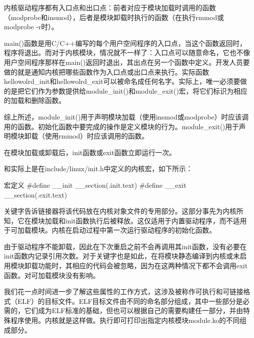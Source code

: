 \documentclass[lang=cn,newtx,10pt,scheme=chinese]{elegantbook}
\begin{document}
内核驱动程序都有入口点和出口点：前者对应于模块加载时调用的函数（modprobe和insmod），后者是模块卸载时执行的函数（在执行rmmod或modprobe -r时）。

main()函数是用C/C++编写的每个用户空间程序的入口点，当这个函数返回时，程序将退出。而对于内核模块，情况就不一样了：入口点可以随意命名，它也不像用户空间程序那样在main()返回时退出，其出点在另一个函数中定义。开发人员要做的就是通知内核把哪些函数作为入口点或出口点来执行。实际函数hellowolrd\_init和hellowolrd\_exit可以被命名成任何名字。实际上，唯一必须要做的是把它们作为参数提供给module\_init()和module\_exit()宏，将它们标识为相应的加载和删除函数。

综上所述，module\_init()用于声明模块加载（使用insmod或modprobe）时应该调用的函数。初始化函数中要完成的操作是定义模块的行为。module\_exit()用于声明模块卸载（使用rmmod）时应该调用的函数。

\begin{marker}
在模块加载或卸载后，init函数或exit函数立即运行一次。
\end{marker}


和实际上是在include/linux/init.h中定义的内核宏，如下所示：

\begin{mycode}{宏定义}
#define __init __section(.init.text)
#define __exit __section(.exit.text)
\end{mycode}

关键字告诉链接器将该代码放在内核对象文件的专用部分。这部分事先为内核所知，它在模块加载和init函数执行后被释放。这仅适用于内置驱动程序，而不适用于可加载模块。内核在启动过程中第一次运行驱动程序的初始化函数。

由于驱动程序不能卸载，因此在下次重启之前不会再调用其init函数，没有必要在init函数内记录引用次数。对于关键字也是如此，在将模块静态编译到内核或未启用模块卸载功能时，其相应的代码会被忽略，因为在这两种情况下都不会调用exit函数。对可加载模块没有影响。

我们花一点时间进一步了解这些属性的工作方式，这涉及被称作可执行和可链接格式（ELF）的目标文件。ELF目标文件由不同的命名部分组成，其中一些部分是必需的，它们成为ELF标准的基础，但也可以根据自己的需要构建任一部分，并由特殊程序使用。内核就是这样做。执行即可打印出指定内核模块module.ko的不同组成部分。
\end{document}
